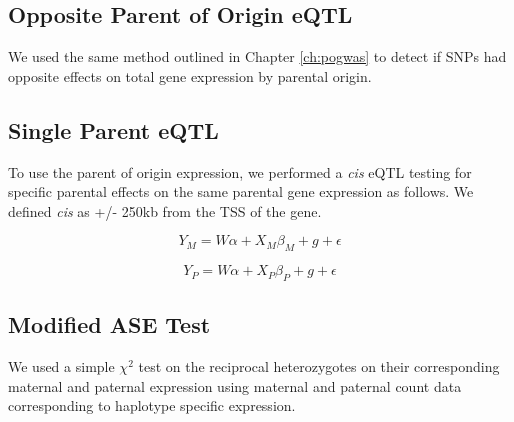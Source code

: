 \subsection{Opposite Parent of Origin eQTL}\label{Opposite Parent of Origin eQTL}
We used the same method outlined in Chapter \ref{ch:pogwas} to detect if SNPs had opposite effects on total gene expression by parental origin. 

\subsection{Single Parent eQTL}\label{Single Parent eQTL}
To use the parent of origin expression, we performed a \emph{cis} eQTL testing for specific parental effects on the same parental gene expression as follows. We defined \emph{cis} as +/- 250kb from the TSS of the gene. 

\begin{equation}
Y _{M}=W\alpha + X_{M}\beta_{M}+g+\epsilon
\end{equation}

\begin{equation}
Y _{P}=W\alpha + X_{P}\beta_{P}+g+\epsilon
\end{equation}


\subsection{Modified ASE Test}\label{Modified ASE Test}
We used a simple $\chi^2$ test on the reciprocal heterozygotes on their corresponding maternal and paternal expression using maternal and paternal count data corresponding to haplotype specific expression. 






